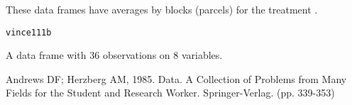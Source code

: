 \begin{Description}\relax
These data frames have averages by blocks (parcels) for the treatment
.
\end{Description}
\begin{Usage}
\begin{verbatim}vince111b\end{verbatim}
\end{Usage}
\begin{Format}\relax
A data frame with 36 observations on 8 variables.
\end{Format}
\begin{Source}\relax
Andrews DF; Herzberg AM, 1985. Data. A Collection of Problems from
Many Fields for the Student and Research Worker. Springer-Verlag.
(pp. 339-353)
\end{Source}

